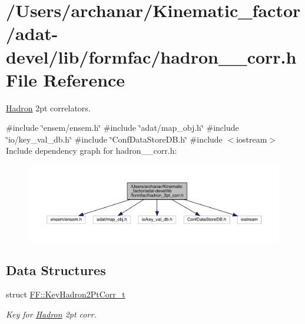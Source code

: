 \hypertarget{adat-devel_2lib_2formfac_2hadron__2pt__corr_8h}{}\section{/\+Users/archanar/\+Kinematic\+\_\+factor/adat-\/devel/lib/formfac/hadron\+\_\+2pt\+\_\+corr.h File Reference}
\label{adat-devel_2lib_2formfac_2hadron__2pt__corr_8h}


\mbox{\hyperlink{namespaceHadron}{Hadron}} 2pt correlators.  


{\ttfamily \#include \char`\"{}ensem/ensem.\+h\char`\"{}}\newline
{\ttfamily \#include \char`\"{}adat/map\+\_\+obj.\+h\char`\"{}}\newline
{\ttfamily \#include \char`\"{}io/key\+\_\+val\+\_\+db.\+h\char`\"{}}\newline
{\ttfamily \#include \char`\"{}Conf\+Data\+Store\+D\+B.\+h\char`\"{}}\newline
{\ttfamily \#include $<$iostream$>$}\newline
Include dependency graph for hadron\+\_\+2pt\+\_\+corr.\+h\+:
\nopagebreak
\begin{figure}[H]
\begin{center}
\leavevmode
\includegraphics[width=350pt]{d6/dbd/adat-devel_2lib_2formfac_2hadron__2pt__corr_8h__incl}
\end{center}
\end{figure}
\subsection*{Data Structures}
\begin{DoxyCompactItemize}
\item 
struct \mbox{\hyperlink{structFF_1_1KeyHadron2PtCorr__t}{F\+F\+::\+Key\+Hadron2\+Pt\+Corr\+\_\+t}}
\begin{DoxyCompactList}\small\item\em Key for \mbox{\hyperlink{namespaceHadron}{Hadron}} 2pt corr. \end{DoxyCompactList}\end{DoxyCompactItemize}
